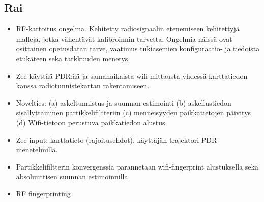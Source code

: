 \documentclass[a4paper]{scrartcl}
\begin{document}
\subsection{Rai\cite{rai2012zee}}
\begin{itemize}
  \item RF-kartoitus ongelma. Kehitetty radiosignaalin etenemiseen kehitettyjä
    malleja, jotka vähentävät kalibroinnin tarvetta. Ongelmia näissä ovat
    osittainen opetusdatan tarve, vaatimus tukiasemien konfiguraatio- ja
    tiedoista etukäteen sekä tarkkuuden menetys.
  \item Zee käyttää PDR:ää ja samanaikaista wifi-mittausta yhdessä karttatiedon
    kanssa radiotunnistekartan rakentamiseen.
  \item Novelties: (a) askeltunnistus ja suunnan estimointi (b) askellustiedon
    sisällyttäminen partikkelifiltteriin (c) menneisyyden paikkatietojen
    päivitys (d) Wifi-tietoon perustuva paikkatiedon alustus.
  \item Zee input: karttatieto (rajoitusehdot), käyttäjän trajektori
    PDR-menetelmillä.
  \item Partikkelifiltterin konvergenssia parannetaan wifi-fingerprint
    alustuksella sekä absoluuttisen suunnan estimoinnilla.
  \item RF fingerprinting 
\end{itemize}

\cite{li2012reliable}
\cite{evennou2006advanced}
\cite{groves2013principles}
\cite{leppakoski2013pedestrian}
\cite{woodman2009rf}
\cite{kunze2009way}
\cite{stirling2003innovative}
\cite{steinhoff2010dead}
\cite{wang2012unsupervised}
\cite{renaudin2013adaptative}
\cite{madgwick2011estimation}
\cite{mautz2012indoor}
\cite{faragher2012opportunistic}



\end{document}
